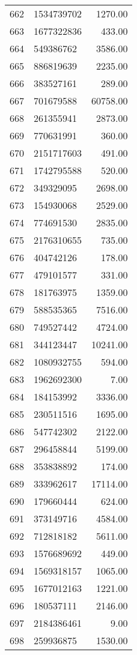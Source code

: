 \begin{table}[ht]
\begin{tabular}{rlr}
  662 & 1534739702 & 1270.00 \\ 
  663 & 1677322836 & 433.00 \\ 
  664 & 549386762 & 3586.00 \\ 
  665 & 886819639 & 2235.00 \\ 
  666 & 383527161 & 289.00 \\ 
  667 & 701679588 & 60758.00 \\ 
  668 & 261355941 & 2873.00 \\ 
  669 & 770631991 & 360.00 \\ 
  670 & 2151717603 & 491.00 \\ 
  671 & 1742795588 & 520.00 \\ 
  672 & 349329095 & 2698.00 \\ 
  673 & 154930068 & 2529.00 \\ 
  674 & 774691530 & 2835.00 \\ 
  675 & 2176310655 & 735.00 \\ 
  676 & 404742126 & 178.00 \\ 
  677 & 479101577 & 331.00 \\ 
  678 & 181763975 & 1359.00 \\ 
  679 & 588535365 & 7516.00 \\ 
  680 & 749527442 & 4724.00 \\ 
  681 & 344123447 & 10241.00 \\ 
  682 & 1080932755 & 594.00 \\ 
  683 & 1962692300 & 7.00 \\ 
  684 & 184153992 & 3336.00 \\ 
  685 & 230511516 & 1695.00 \\ 
  686 & 547742302 & 2122.00 \\ 
  687 & 296458844 & 5199.00 \\ 
  688 & 353838892 & 174.00 \\ 
  689 & 333962617 & 17114.00 \\ 
  690 & 179660444 & 624.00 \\ 
  691 & 373149716 & 4584.00 \\ 
  692 & 712818182 & 5611.00 \\ 
  693 & 1576689692 & 449.00 \\ 
  694 & 1569318157 & 1065.00 \\ 
  695 & 1677012163 & 1221.00 \\ 
  696 & 180537111 & 2146.00 \\ 
  697 & 2184386461 & 9.00 \\ 
  698 & 259936875 & 1530.00 \\ 

\end{tabular}
\end{table}
